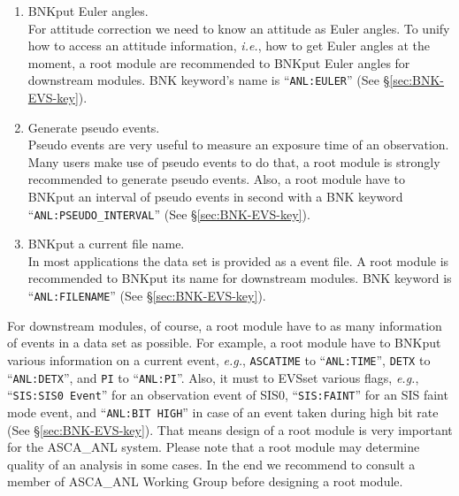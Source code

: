 \begin{enumerate}
\item BNKput Euler angles. \\
  For attitude correction
  we need to know an attitude as Euler angles.
  To unify how to access an attitude information,
  {\em i.e.}, how to get Euler angles at the moment,
  a root module are recommended to BNKput Euler angles for downstream modules.
  BNK keyword's name is ``{\tt ANL:EULER}'' (See \S \ref{sec:BNK-EVS-key}).
\item Generate pseudo events. \\
  Pseudo events are very useful to measure an exposure time of an observation.
  Many users make use of pseudo events to do that,
  a root module is strongly recommended to generate pseudo events.
  Also, a root module have to BNKput an interval of pseudo events in second
  with a BNK keyword ``{\tt ANL:PSEUDO\_INTERVAL}''
  (See \S \ref{sec:BNK-EVS-key}).
\item BNKput a current file name. \\
  In most applications the data set is provided as a event file.
  A root module is recommended to BNKput its name for downstream modules.
  BNK keyword is ``{\tt ANL:FILENAME}'' (See \S \ref{sec:BNK-EVS-key}).
\end{enumerate}

For downstream modules,
of course,
a root module have to as many information of events in a data set as possible.
For example,
a root module have to BNKput various information on a current event,
{\em e.g.},
{\tt ASCATIME} to ``{\tt ANL:TIME}'',
{\tt DETX} to ``{\tt ANL:DETX}'',
and {\tt PI} to ``{\tt ANL:PI}''.
Also,
it must to EVSset various flags,
{\em e.g.},
``{\tt SIS:SIS0 Event}'' for an observation event of SIS0,
``{\tt SIS:FAINT}'' for an SIS faint mode event,
and ``{\tt ANL:BIT HIGH}'' in case of an event taken during high bit rate
(See \S \ref{sec:BNK-EVS-key}).
That means design of a root module is very important for the ASCA\_ANL system.
Please note that
a root module may determine quality of an analysis in some cases.
In the end
we recommend to consult a member of ASCA\_ANL Working Group
before designing a root module.
